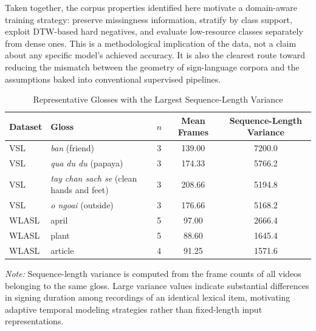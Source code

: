 \documentclass{ieeeaccess}
\begin{document}
Taken together, the corpus properties identified here motivate a domain-aware training strategy: preserve missingness information, stratify by class support, exploit DTW-based hard negatives, and evaluate low-resource classes separately from dense ones. This is a methodological implication of the data, not a claim about any specific model's achieved accuracy. It is also the clearest route toward reducing the mismatch between the geometry of sign-language corpora and the assumptions baked into conventional supervised pipelines.


\begin{table}[!t]
\caption{Representative Glosses with the Largest Sequence-Length Variance}
\label{tab:app_sequence}

\centering
\small
\setlength{\tabcolsep}{6pt}

\begin{tabular}{llccc}
\toprule
\textbf{Dataset} &
\textbf{Gloss} &
\textbf{$n$} &
\textbf{Mean Frames} &
\textbf{Sequence-Length Variance} \\
\midrule

VSL &
\textit{ban} (friend) &
3 &
139.00 &
7200.0 \\

VSL &
\textit{qua du du} (papaya) &
3 &
174.33 &
5766.2 \\

VSL &
\textit{tay chan sach se} (clean hands and feet) &
3 &
208.66 &
5194.8 \\

VSL &
\textit{o ngoai} (outside) &
3 &
176.66 &
5168.2 \\

\midrule

WLASL &
april &
5 &
97.00 &
2666.4 \\

WLASL &
plant &
5 &
88.60 &
1645.4 \\

WLASL &
article &
4 &
91.25 &
1571.6 \\

\bottomrule
\end{tabular}

\vspace{2mm}

\footnotesize
\textit{Note:}
Sequence-length variance is computed from the frame counts of all videos belonging to the same gloss.
Large variance values indicate substantial differences in signing duration among recordings of an identical lexical item, motivating adaptive temporal modeling strategies rather than fixed-length input representations.

\end{table}
\end{document}
